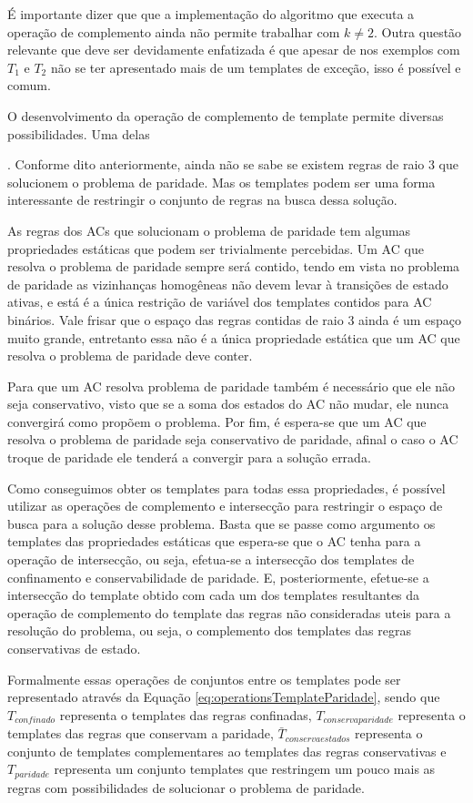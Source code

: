 	É importante dizer que que a implementação do algoritmo que executa a operação de complemento ainda não permite trabalhar com $k\neq 2$. Outra questão relevante que deve ser devidamente enfatizada é que apesar de nos exemplos com $T_1$ e $T_2$ não se ter apresentado mais de um templates de exceção, isso é possível e comum.

	O desenvolvimento da operação de complemento de template permite diversas possibilidades. Uma delas

	 . Conforme dito anteriormente, ainda não se sabe se existem regras de raio 3 que solucionem o problema de paridade. Mas os templates podem ser uma forma interessante de restringir o conjunto de regras na busca dessa solução.

	As regras dos ACs que solucionam o problema de paridade tem algumas propriedades estáticas que podem ser trivialmente percebidas. Um AC que resolva o problema de paridade sempre será contido, tendo em vista no problema de paridade as vizinhanças homogêneas não devem levar à transições de estado ativas, e está é a única restrição de variável dos templates contidos para AC binários. Vale frisar que o espaço das regras contidas de raio 3 ainda é um espaço muito grande, entretanto essa não é a única propriedade estática que um AC que resolva o problema de paridade deve conter.

	Para que um AC resolva problema de paridade também é necessário que ele não seja conservativo, visto que se a soma dos estados do AC não mudar, ele nunca convergirá como propõem o problema. Por fim, é espera-se que um AC que resolva o problema de paridade seja conservativo de paridade, afinal o caso o AC troque de paridade ele tenderá a convergir para a solução errada.

	Como conseguimos obter os templates para todas essa propriedades, é possível utilizar as operações de complemento e intersecção para restringir o espaço de busca para a solução desse problema. Basta que se passe como argumento os templates das propriedades estáticas que espera-se que o AC tenha para a operação de intersecção, ou seja, efetua-se a intersecção dos templates de confinamento e conservabilidade de paridade. E, posteriormente, efetue-se a intersecção do template obtido com cada um dos templates resultantes da operação de complemento do template das regras não consideradas uteis para a resolução do problema, ou seja, o complemento dos templates das regras conservativas de estado.

	Formalmente essas operações de conjuntos entre os templates pode ser representado através da Equação \ref{eq:operationsTemplateParidade}, sendo que $T_{confinado}$ representa o templates das regras confinadas, $T_{conservaparidade}$ representa o templates das regras que conservam a paridade, $\bar{T}_{conservaestados}$ representa o conjunto de templates complementares ao templates das regras conservativas e $T_{paridade}$ representa um conjunto templates que restringem um pouco mais as regras com possibilidades de solucionar o problema de paridade.

